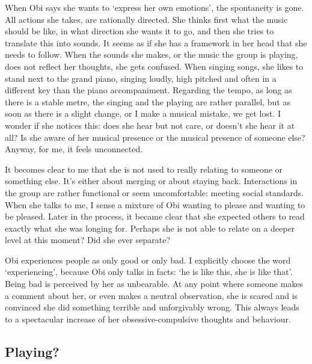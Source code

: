 \documentclass[authordate, empirical, issue]{jote-new-article}
\begin{document}
When Obi says she wants to ‘express her own emotions', the spontaneity is gone. All actions she takes, are rationally directed. She thinks first what the music should be like, in what direction she wants it to go, and then she tries to translate this into sounds. It seems as if she has a framework in her head that she needs to follow. When the sounds she makes, or the music the group is playing, does not reflect her thoughts, she gets confused. When singing songs, she likes to stand next to the grand piano, singing loudly, high pitched and often in a different key than the piano accompaniment. Regarding the tempo, as long as there is a stable metre, the singing and the playing are rather parallel, but as soon as there is a slight change, or I make a musical mistake, we get lost. I wonder if she notices this: does she hear but not care, or doesn't she hear it at all? Is she aware of her musical presence or the musical presence of someone else? Anyway, for me, it feels unconnected.



It becomes clear to me that she is not used to really relating to someone or something else. It's either about merging or about staying back. Interactions in the group are rather functional or seem uncomfortable: meeting social standards. When she talks to me, I sense a mixture of Obi wanting to please and wanting to be pleased. Later in the process, it became clear that she expected others to read exactly what she was longing for. Perhaps she is not able to relate on a deeper level at this moment? Did she ever separate?



Obi experiences people as only good or only bad. I explicitly choose the word ‘experiencing', because Obi only talks in facts: ‘he is like this, she is like that'. Being bad is perceived by her as unbearable. At any point where someone makes a comment about her, or even makes a neutral observation, she is scared and is convinced she did something terrible and unforgivably wrong. This always leads to a spectacular increase of her obsessive-compulsive thoughts and behaviour.







\subsection{Playing?}
\end{document}
